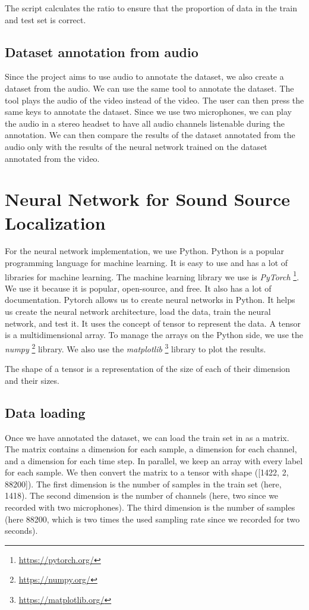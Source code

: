 The script calculates the ratio to ensure that the proportion of data in the train and test set is correct.

\subsection{Dataset annotation from audio}

Since the project aims to use audio to annotate the dataset, we also create a dataset from the audio. We can use the same tool to annotate the dataset. The tool plays the audio of the video instead of the video. The user can then press the same keys to annotate the dataset. Since we use two microphones, we can play the audio in a stereo headset to have all audio channels listenable during the annotation. We can then compare the results of the dataset annotated from the audio only with the results of the neural network trained on the dataset annotated from the video. 

\section{Neural Network for Sound Source Localization}

For the neural network implementation, we use Python. Python is a popular programming language for machine learning. It is easy to use and has a lot of libraries for machine learning. The machine learning library we use is \textit{PyTorch} \footnote{\url{https://pytorch.org/}}. We use it because it is popular, open-source, and free. It also has a lot of documentation. Pytorch allows us to create neural networks in Python. It helps us create the neural network architecture, load the data, train the neural network, and test it. It uses the concept of tensor to represent the data. A tensor is a multidimensional array. To manage the arrays on the Python side, we use the \textit{numpy} \footnote{\url{https://numpy.org/}} library. We also use the \textit{matplotlib} \footnote{\url{https://matplotlib.org/}} library to plot the results. 

The shape of a tensor is a representation of the size of each of their dimension and their sizes.

\subsection{Data loading}

Once we have annotated the dataset, we can load the train set in as a matrix. The matrix contains a dimension for each sample, a dimension for each channel, and a dimension for each time step. In parallel, we keep an array with every label for each sample. We then convert the matrix to a tensor with shape ([1422, 2, 88200]). The first dimension is the number of samples in the train set (here, 1418). The second dimension is the number of channels (here, two since we recorded with two microphones). The third dimension is the number of samples (here 88200, which is two times the used sampling rate since we recorded for two seconds). 

